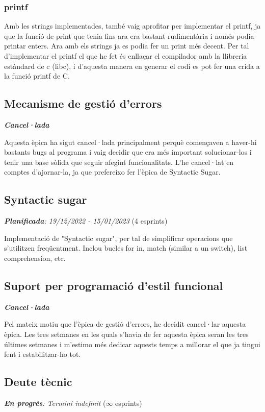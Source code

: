 ﻿\documentclass{article}
\begin{document}
\subsubsection{printf}
Amb les strings implementades, també vaig aprofitar per implementar el printf,
ja que la funció de print que tenia fins ara era bastant rudimentària i només
podia printar enters. Ara amb els strings ja es podia fer un print més decent.
Per tal d'implementar el printf el que he fet és enllaçar el compilador amb la
llibreria estàndard de c (libc), i d'aquesta manera en generar el codi es pot
fer una crida a la funció printf de C.

\subsection{Mecanisme de gestió d'errors}
\textit{\textbf{Cancel·lada}}

Aquesta èpica ha sigut cancel·lada principalment perquè començaven a haver-hi 
bastants bugs al programa i vaig decidir que era més important solucionar-los
i tenir una base sòlida que seguir afegint funcionalitats. L'he cancel·lat en 
comptes d'ajornar-la, ja que prefereixo fer l'èpica de Syntactic Sugar.

\subsection{Syntactic sugar}
\textit{\textbf{Planificada}: 19/12/2022 - 15/01/2023} (4 esprints)

Implementació de "Syntactic sugar", per tal de simplificar operacions que
s'utilitzen freqüentment. Inclou bucles for in, match (similar a un switch),
list comprehension, etc.

\subsection{Suport per programació d'estil funcional}
\textit{\textbf{Cancel·lada}}

Pel mateix motiu que l'èpica de gestió d'errors, he decidit cancel·lar aquesta
èpica. Les tres setmanes en les quals s'havia de fer aquesta èpica seran les
tres últimes setmanes i m'estimo més dedicar aquests temps a millorar el que ja
tingui fent i estabilitzar-ho tot.

\subsection{Deute tècnic}
\textit{\textbf{En progrés}: Termini indefinit} ($\infty$ esprints)
\end{document}
